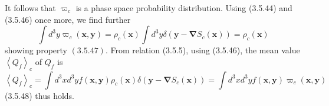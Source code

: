 \documentclass{article}
\begin{document}
It follows that $\varpi_{c}$ is a phase space probability distribution. Using (3.5.44) and (3.5.46) once more, we find further
$$
\begin{equation*}
\int d^{3} y \varpi_{c}(\boldsymbol{x}, \boldsymbol{y})=\rho_{c}(\boldsymbol{x}) \int d^{3} y \delta\left(\boldsymbol{y}-\boldsymbol{\nabla} S_{c}(\boldsymbol{x})\right)=\rho_{c}(\boldsymbol{x}) \tag{3.5.50}
\end{equation*}
$$
showing property $(3.5 .47)$.
From relation (3.5.5), using (3.5.46), the mean value $\left\langle Q_{f}\right\rangle_{c}$ of $Q_{f}$ is
$$
\begin{equation*}
\left\langle Q_{f}\right\rangle_{c}=\int d^{3} x d^{3} y f(\boldsymbol{x}, \boldsymbol{y}) \rho_{c}(\boldsymbol{x}) \delta\left(\boldsymbol{y}-\boldsymbol{\nabla} S_{c}(\boldsymbol{x})\right)=\int d^{3} x d^{3} y f(\boldsymbol{x}, \boldsymbol{y}) \varpi_{c}(\boldsymbol{x}, \boldsymbol{y}) \tag{3.5.51}
\end{equation*}
$$
(3.5.48) thus holds.
\end{document}

